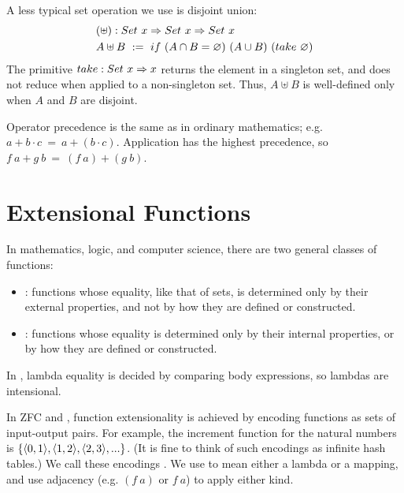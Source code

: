 A less typical set operation we use is disjoint union:
\begin{equation}
\begin{aligned}
	&(\uplus) : Set~x \Rightarrow Set~x \Rightarrow Set~x \\
	&A \uplus B \ := \ if~(A \cap B = \varnothing)~(A \cup B)~(take~\varnothing)
\end{aligned}
\end{equation}
The primitive $take : Set~x \Rightarrow x$ returns the element in a singleton set, and does not reduce when applied to a non-singleton set.
Thus, $A \uplus B$ is well-defined only when $A$ and $B$ are disjoint.

Operator precedence is the same as in ordinary mathematics; e.g. $a + b \cdot c\ =\ a + (b \cdot c)$.
Application has the highest precedence, so $f~a + g~b\ =\ (f~a) + (g~b)$.


\section{Extensional Functions}

In mathematics, logic, and computer science, there are two general classes of functions:
\begin{itemize}
	\item {}: functions whose equality, like that of sets, is determined only by their external properties, and not by how they are defined or constructed.
	\item {}: functions whose equality is determined only by their internal properties, or by how they are defined or constructed.
\end{itemize}
In \lzfclang, lambda equality is decided by comparing body expressions, so lambdas are intensional.

In ZFC and \lzfclang, function extensionality is achieved by encoding functions as sets of input-output pairs.
For example, the increment function for the natural numbers is $\{{\langle{0,1}\rangle,\langle{1,2}\rangle,\langle{2,3}\rangle,...}\}$.
(It is fine to think of such encodings as infinite hash tables.)
We call these encodings .
We use  to mean either a lambda or a mapping, and use adjacency (e.g. $(f~a)$ or $f~a$) to apply either kind.


